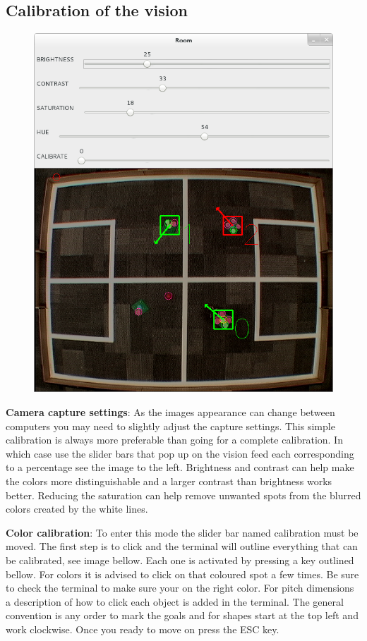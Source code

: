\documentclass[a4paper,12pt]{article}
\begin{document}
\subsection{Calibration of the vision} \label{calibration}

\begin{figure}
\centering
\includegraphics[scale=0.25]{images/calibration1.png}
\end{figure} 
\textbf{Camera capture settings}: As the images appearance can change between computers you may need to slightly adjust the capture settings. This simple calibration is always more preferable than going for a complete calibration. In which case use the slider bars that pop up on the vision feed each corresponding to a percentage see the image to the left. Brightness and contrast can help make the colors more distinguishable and a larger contrast than brightness works better. Reducing the saturation can help remove unwanted spots from the blurred colors created by the white lines.   
 
\textbf{Color calibration}: To enter this mode the slider bar named calibration must be moved. The first step is to click and the terminal will outline everything that can be calibrated, see image bellow. Each one is activated by pressing a key outlined bellow. For colors it is advised to click on that coloured spot a few times. Be sure to check the terminal to make sure your on the right color. For pitch dimensions a description of how to click each object is added in the terminal. The general convention is any order to mark the goals and for shapes start at the top left and work clockwise. Once you ready to move on press the ESC key. 
\end{document}
